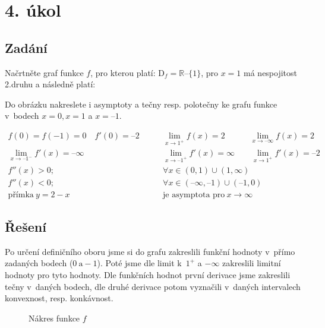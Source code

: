 \section{4. úkol}

\subsection{Zadání}
Načrtněte graf funkce $f$,
pro kterou platí: $\text{D}_{f} = \mathbb{R} – \{1\}$, pro $x = 1$ má nespojitost 2.druhu a následně platí:

Do obrázku nakreslete i asymptoty a tečny resp. polotečny ke grafu funkce v~bodech $x = 0, x = 1$ a $x = –1$.

\begin{align*}
f(0) = f(-1) = 0\quad f'(0) = –2 &\qquad \lim_{x\rightarrow 1^{+}} f(x) = 2\qquad\quad\lim_{x\rightarrow –\infty} f(x) = 2\\
\lim_{x\rightarrow –1^{-}} f'(x) = – \infty&\qquad \lim_{x\rightarrow –1^{+}} f'(x) = \infty\qquad\lim_{x\rightarrow 1^{+}} f'(x) = – 2\\
f''(x) > 0;&\qquad\forall x \in (0, 1) \cup (1, \infty)\\
f''(x) < 0;&\qquad\forall x \in (–\infty, –1) \cup (–1,0)\\
\text{přímka}\ y = 2 - x &\qquad\text{je asymptota pro}\ x\rightarrow \infty
\end{align*}

\subsection{Řešení}
Po určení definičního oboru jsme si do grafu zakreslili funkční hodnoty v~přímo zadaných bodech ($0\ \text{a} -1$). Poté jsme dle limit k~$1^+$ a $-\infty$ zakreslili limitní hodnoty pro tyto hodnoty. Dle funkčních hodnot první derivace jsme zakreslili tečny v~daných bodech, dle druhé derivace potom vyznačili v~daných intervalech konvexnost, resp. konkávnost.

\begin{figure}[H]
	\centering
	
	\caption{Nákres funkce $f$}
\end{figure}
